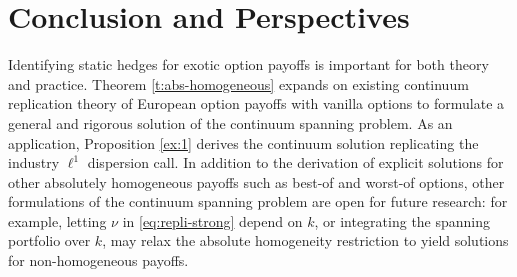 \documentclass[11pt,A4,twoside]{article}
\numberwithin{equation}{section}
\renewcommand{\vec}{\mathbf}
\theoremstyle{definition}
\theoremstyle{remark}
\def\then{l}\def\then{n}%
\begin{document}
\FloatBarrier
\section{Conclusion and Perspectives}\label{sec:conclusion}

Identifying static hedges for exotic option payoffs is important for both theory and practice.  Theorem \ref{t:abs-homogeneous} expands on existing continuum replication theory of European option payoffs with vanilla options to formulate a general and rigorous solution of the continuum spanning problem.  As an application, Proposition \ref{ex:1} derives the continuum solution replicating the industry $\ell^1$ dispersion call.  In addition to the derivation of explicit solutions  for other absolutely homogeneous payoffs such as best-of and worst-of options, other formulations of the continuum spanning problem are open for future research: for example, letting $\nu$ in \eqref{eq:repli-strong} depend on $k$, or integrating the spanning portfolio over $k$, may relax the absolute homogeneity restriction to yield solutions for non-homogeneous payoffs.
\end{document}
